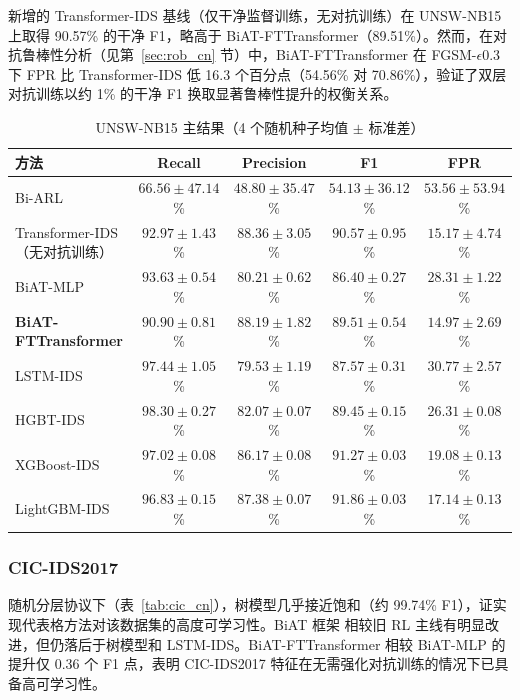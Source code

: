 \documentclass[12pt,a4paper]{ctexart}
\begin{document}
新增的 Transformer-IDS 基线（仅干净监督训练，无对抗训练）在 UNSW-NB15 上取得 90.57\% 的干净 F1，略高于 BiAT-FTTransformer（89.51\%）。然而，在对抗鲁棒性分析（见第~\ref{sec:rob_cn} 节）中，BiAT-FTTransformer 在 FGSM-$\epsilon$0.3 下 FPR 比 Transformer-IDS 低 16.3 个百分点（54.56\% 对 70.86\%），验证了双层对抗训练以约 1\% 的干净 F1 换取显著鲁棒性提升的权衡关系。

\begin{table}[H]
\centering
\caption{UNSW-NB15 主结果（4 个随机种子均值 $\pm$ 标准差）}
\label{tab:unsw_cn}
\begin{tabular}{lcccc}
\toprule
\textbf{方法} & \textbf{Recall} & \textbf{Precision} & \textbf{F1} & \textbf{FPR} \\
\midrule
Bi-ARL & $66.56{\pm}47.14$\% & $48.80{\pm}35.47$\% & $54.13{\pm}36.12$\% & $53.56{\pm}53.94$\% \\
Transformer-IDS（无对抗训练） & $92.97{\pm}1.43$\% & $88.36{\pm}3.05$\% & $90.57{\pm}0.95$\% & $15.17{\pm}4.74$\% \\
BiAT-MLP & $93.63{\pm}0.54$\% & $80.21{\pm}0.62$\% & $86.40{\pm}0.27$\% & $28.31{\pm}1.22$\% \\
\textbf{BiAT-FTTransformer} & $90.90{\pm}0.81$\% & $88.19{\pm}1.82$\% & $\mathbf{89.51{\pm}0.54}$\% & $\mathbf{14.97{\pm}2.69}$\% \\
LSTM-IDS & $\mathbf{97.44{\pm}1.05}$\% & $79.53{\pm}1.19$\% & $87.57{\pm}0.31$\% & $30.77{\pm}2.57$\% \\
HGBT-IDS & $98.30{\pm}0.27$\% & $82.07{\pm}0.07$\% & $89.45{\pm}0.15$\% & $26.31{\pm}0.08$\% \\
XGBoost-IDS & $97.02{\pm}0.08$\% & $86.17{\pm}0.08$\% & $91.27{\pm}0.03$\% & $19.08{\pm}0.13$\% \\
LightGBM-IDS & $96.83{\pm}0.15$\% & $\mathbf{87.38{\pm}0.07}$\% & $91.86{\pm}0.03$\% & $17.14{\pm}0.13$\% \\
\bottomrule
\end{tabular}
\end{table}

\subsubsection{CIC-IDS2017}

随机分层协议下（表~\ref{tab:cic_cn}），树模型几乎接近饱和（约 99.74\% F1），证实现代表格方法对该数据集的高度可学习性。BiAT 框架 相较旧 RL 主线有明显改进，但仍落后于树模型和 LSTM-IDS。BiAT-FTTransformer 相较 BiAT-MLP 的提升仅 0.36 个 F1 点，表明 CIC-IDS2017 特征在无需强化对抗训练的情况下已具备高可学习性。
\end{document}
